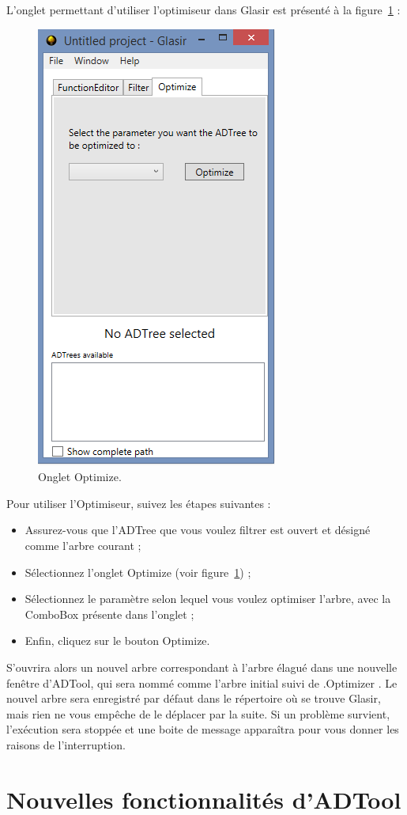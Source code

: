 L'onglet permettant d'utiliser l'optimiseur dans Glasir est présenté à la {\sc figure}~\ref{fig:opti} :

 \begin{figure}[H]
        \centering
        \includegraphics[height=0.7\textwidth]{figure/optimizer.png}
        \caption{Onglet Optimize.}
        \label{fig:opti}
    \end{figure}

Pour utiliser l'Optimiseur, suivez les étapes suivantes :

\begin{itemize}
\item Assurez-vous que l'ADTree que vous voulez filtrer est ouvert et désigné comme l'arbre courant ;
\item Sélectionnez l'onglet \og Optimize \fg{} (voir {\sc figure}~\ref{fig:opti}) ;
\item Sélectionnez le paramètre selon lequel vous voulez optimiser l'arbre, avec la ComboBox présente dans l'onglet ;
\item Enfin, cliquez sur le bouton \og Optimize\fg{}.
\end{itemize}

S'ouvrira alors un nouvel arbre correspondant à l'arbre élagué dans une nouvelle fenêtre d'ADTool, qui sera nommé comme l'arbre initial suivi de \og .Optimizer \fg{}. Le nouvel arbre sera enregistré par défaut dans le répertoire où se trouve Glasir, mais rien ne vous empêche de le déplacer par la suite.
Si un problème survient, l'exécution sera stoppée et une boite de message apparaîtra pour vous donner les raisons de l'interruption.

\section{Nouvelles fonctionnalités d'ADTool}
\label{ssec:manuelADTool}

